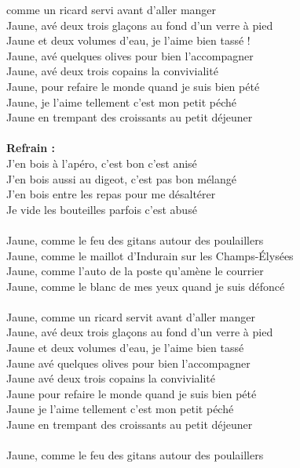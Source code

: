 
 comme un ricard servi avant d'aller manger
\\Jaune, avé deux trois glaçons au fond d'un verre à pied
\\Jaune et deux volumes d'eau, je l'aime bien tassé !
\\Jaune, avé quelques olives pour bien l'accompagner
\\Jaune, avé deux trois copains la convivialité
\\Jaune, pour refaire le monde quand je suis bien pété
\\Jaune, je l'aime tellement c'est mon petit péché
\\Jaune en trempant des croissants au petit déjeuner
\\\\\textbf{Refrain :}
\\J'en bois à l'apéro, c'est bon c'est anisé
\\J'en bois aussi au digeot, c'est pas bon mélangé
\\J'en bois entre les repas pour me désaltérer
\\Je vide les bouteilles parfois c'est abusé
\\\\Jaune, comme le feu des gitans autour des poulaillers
\\Jaune, comme le maillot d'Indurain sur les Champs-Élysées
\\Jaune, comme l'auto de la poste qu'amène le courrier
\\Jaune, comme le blanc de mes yeux quand je suis défoncé
\\\\Jaune, comme un ricard servit avant d'aller manger
\\Jaune, avé deux trois glaçons au fond d'un verre à pied
\\Jaune et deux volumes d'eau, je l'aime bien tassé
\\Jaune avé quelques olives pour bien l'accompagner
\\Jaune avé deux trois copains la convivialité
\\Jaune pour refaire le monde quand je suis bien pété
\\Jaune je l'aime tellement c'est mon petit péché
\\Jaune en trempant des croissants au petit déjeuner
\\\\Jaune, comme le feu des gitans autour des poulaillers
